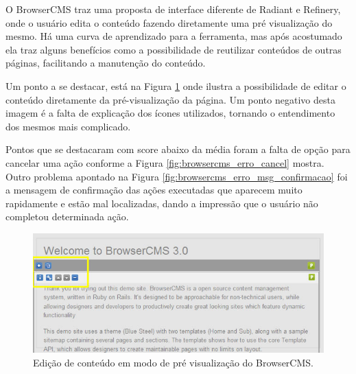 O BrowserCMS traz uma proposta de interface diferente de Radiant e Refinery, onde o usuário edita o conteúdo fazendo diretamente uma pré visualização do mesmo. Há uma curva de aprendizado para a ferramenta, mas após acostumado ela traz alguns benefícios como a possibilidade de reutilizar conteúdos de outras páginas, facilitando a manutenção do conteúdo.

Um ponto a se destacar, está na Figura \ref{fig:browsercms_neutro_icones} onde ilustra a possibilidade de editar o conteúdo diretamente da pré-visualização da página. Um ponto negativo desta imagem é a falta de explicação dos ícones utilizados, tornando o entendimento dos mesmos mais complicado.

Pontos que se destacaram com score abaixo da média foram a falta de opção para cancelar uma ação conforme a Figura \ref{fig:browsercms_erro_cancel} mostra. Outro problema apontado na Figura \ref{fig:browsercms_erro_msg_confirmacao} foi a mensagem de confirmação das ações executadas que aparecem muito rapidamente e estão  mal localizadas, dando a impressão que o usuário não completou determinada ação.

\begin{figure}[here]
\includegraphics[width=150mm]{images/browsercms_neutro_icones.jpg}
\caption{Edição de conteúdo em modo de pré visualização do BrowserCMS.}
\label{fig:browsercms_neutro_icones}
\end{figure}

